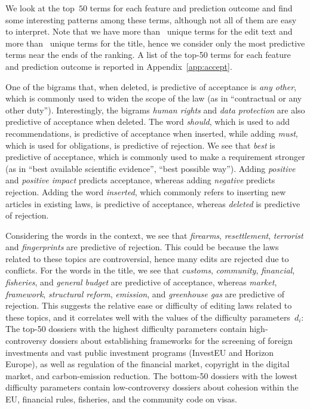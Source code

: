 We look at the top~$50$ terms for each feature and prediction outcome and find some interesting patterns among these terms, although not all of them are easy to interpret.
Note that we have more than~ unique terms for the edit text and more than~ unique terms for the title, hence we consider only the most predictive terms near the ends of the ranking.
A list of the top-50 terms for each feature and prediction outcome is reported in Appendix~\ref{app:accept}.

One of the bigrams that, when deleted, is predictive of acceptance is \textit{any other}, which is commonly used to widen the scope of the law (as in ``contractual or any other duty'').
Interestingly, the bigrams \textit{human rights} and \textit{data protection} are also predictive of acceptance when deleted.
The word \textit{should}, which is used to add recommendations, is predictive of acceptance when inserted, while adding \textit{must}, which is used for obligations, is predictive of rejection.
We see that \textit{best} is predictive of acceptance, which is commonly used to make a requirement stronger (as in ``best available scientific evidence'', ``best possible way'').
Adding \textit{positive} and \textit{positive impact} predicts acceptance, whereas adding \textit{negative} predicts rejection.
Adding the word \textit{inserted}, which commonly refers to inserting new articles in existing laws, is predictive of acceptance, whereas \textit{deleted} is predictive of rejection.

Considering the words in the context, we see that \textit{firearms}, \textit{resettlement}, \textit{terrorist} and \textit{fingerprints} are predictive of rejection.
This could be because the laws related to these topics are controversial, hence many edits are rejected due to conflicts.
For the words in the title, we see that \textit{customs}, \textit{community}, \textit{financial}, \textit{fisheries}, and \textit{general budget} are predictive of acceptance, whereas \textit{market}, \textit{framework}, \textit{structural reform}, \textit{emission},  and \textit{greenhouse gas} are predictive of rejection.
This suggests the relative ease or difficulty of editing laws related to these topics, and it correlates well with the values of the difficulty parameters~$d_i$:
The top-50 dossiers with the highest difficulty parameters contain high-controversy dossiers about establishing frameworks for the screening of foreign investments and vast public investment programs (InvestEU and Horizon Europe), as well as regulation of the financial market, copyright in the digital market, and carbon-emission reduction.
The bottom-50 dossiers with the lowest difficulty parameters contain low-controversy dossiers about cohesion within the EU, financial rules, fisheries, and the community code on visas.

